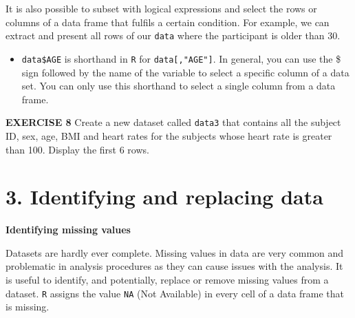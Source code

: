 \documentclass[
]{article}
\newenvironment{Shaded}{\begin{snugshade}}{\end{snugshade}}
\newcommand{\CommentTok}[1]{\textcolor[rgb]{0.56,0.35,0.01}{\textit{#1}}}
\newcommand{\DecValTok}[1]{\textcolor[rgb]{0.00,0.00,0.81}{#1}}
\newcommand{\KeywordTok}[1]{\textcolor[rgb]{0.13,0.29,0.53}{\textbf{#1}}}
\newcommand{\NormalTok}[1]{#1}
\newcommand{\OperatorTok}[1]{\textcolor[rgb]{0.81,0.36,0.00}{\textbf{#1}}}
\newcommand{\StringTok}[1]{\textcolor[rgb]{0.31,0.60,0.02}{#1}}
\providecommand{\tightlist}{%
  \setlength{\itemsep}{0pt}\setlength{\parskip}{0pt}}
\begin{document}
It is also possible to subset with logical expressions and select the
rows or columns of a data frame that fulfils a certain condition. For
example, we can extract and present all rows of our \texttt{data} where
the participant is older than 30.

\begin{Shaded}
\end{Shaded}

\begin{itemize}
\tightlist
\item
  \texttt{data\$AGE} is shorthand in \texttt{R} for
  \texttt{data{[},"AGE"{]}}. In general, you can use the \$ sign
  followed by the name of the variable to select a specific column of a
  data set. You can only use this shorthand to select a single column
  from a data frame.
\end{itemize}

\textbf{EXERCISE 8} Create a new dataset called \texttt{data3} that
contains all the subject ID, sex, age, BMI and heart rates for the
subjects whose heart rate is greater than 100. Display the first 6 rows.

\begin{Shaded}
\end{Shaded}

\hypertarget{identifying-and-replacing-data}{%
\section{3. Identifying and replacing
data}\label{identifying-and-replacing-data}}

\textbf{Identifying missing values}

Datasets are hardly ever complete. Missing values in data are very
common and problematic in analysis procedures as they can cause issues
with the analysis. It is useful to identify, and potentially, replace or
remove missing values from a dataset. \texttt{R} assigns the value
\texttt{NA} (Not Available) in every cell of a data frame that is
missing.
\end{document}
